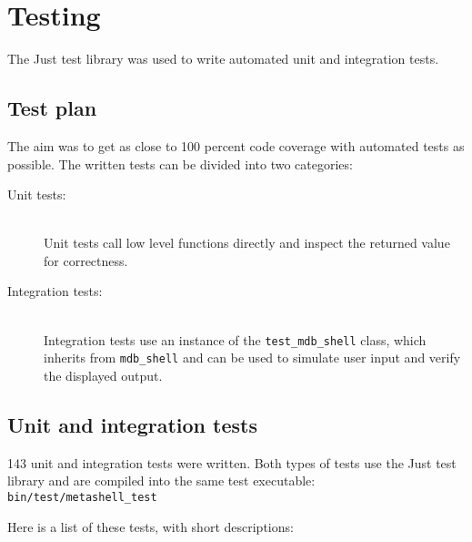 
\chapter{Testing} \label{testing}

The Just\cite{just} test library was used to write automated unit and
integration tests.


\section{Test plan}


The aim was to get as close to 100 percent code coverage with automated tests
as possible. The written tests can be divided into two categories:

\begin{description}
    \item[Unit tests:] \hfill \\
        Unit tests call low level functions directly and inspect the returned
        value for correctness.
    \item[Integration tests:] \hfill \\
        Integration tests use an instance of the \texttt{test\_mdb\_shell}
        class, which inherits from \texttt{mdb\_shell} and can be used to
        simulate user input and verify the displayed output.
\end{description}

\section{Unit and integration tests} \label{tests}

143 unit and integration tests were written. Both types of tests use the Just
test library and are compiled into the same test executable:
\verb$bin/test/metashell_test$

Here is a list of these tests, with short descriptions:

